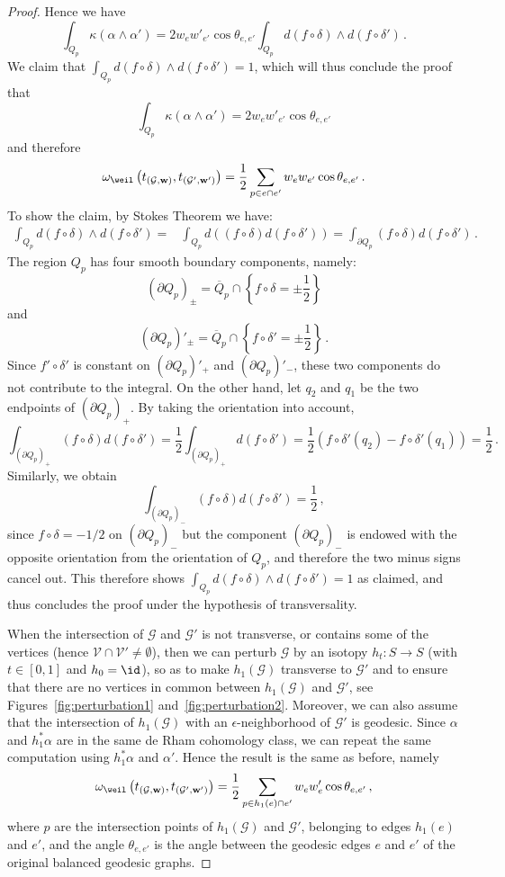 \begin{proof}
Hence we have
\[
\int_{Q_p}\kappa(\alpha\wedge\alpha')=2w_e w'_{e'}\cos\theta_{e,e'}\int_{Q_p}d(f\circ\delta)\wedge d(f\circ\delta')\,.
\]
We claim that $\int_{Q_p}d(f\circ\delta)\wedge d(f\circ\delta')=1$, which will thus conclude the proof that
\[
\int_{Q_p}\kappa(\alpha\wedge\alpha')=2w_e w'_{e'}\cos\theta_{e,e'}
\]
and therefore
\[
\omega_\weil\left(t_{(\mathcal G,\mathbf w)},t_{(\mathcal G',\mathbf w')}\right)=\frac{1}{2}\sum_{p\in e\cap e'}w_ew_{e'}\cos \theta_{e,e'}\,.
\]
To show the claim, by Stokes Theorem we have:
\begin{align*}
\int_{Q_p}d(f\circ\delta)\wedge d(f\circ\delta')=&
\int_{Q_p}d((f\circ\delta) d(f\circ\delta'))=\int_{\partial Q_p}(f\circ\delta) d(f\circ\delta')\,.
\end{align*}
The region $Q_p$ has four smooth boundary components, namely:
\[
(\partial Q_p)_{\pm}=\overline Q_p\cap \left\{f\circ \delta=\pm\frac{1}{2}\right\}
\]
and
\[
(\partial Q_p)'_{\pm}=\overline Q_p\cap \left\{f\circ \delta'=\pm\frac{1}{2}\right\}\,.
\]
Since $f'\circ \delta'$ is constant on $(\partial Q_p)'_{+}$ and $(\partial Q_p)'_{-}$, these two components do not contribute to the integral. On the other hand, let $q_2$ and $q_1$ be the two endpoints of $(\partial Q_p)_{+}$. By taking the orientation into account,
\[
\int_{(\partial Q_p)_+}(f\circ\delta) d(f\circ\delta')=\frac{1}{2}\int_{(\partial Q_p)_+} d(f\circ\delta')=\frac{1}{2}(f\circ \delta'(q_2)-f\circ \delta'(q_1))=\frac{1}{2}\,.
\]
Similarly, we obtain
\[
\int_{(\partial Q_p)_-}(f\circ\delta) d(f\circ\delta')=\frac{1}{2}\,,
\]
since $f\circ \delta=-1/2$ on $(\partial Q_p)_-$ but the component $(\partial Q_p)_-$ is endowed with the opposite orientation from the orientation of $Q_p$, and therefore the two minus signs cancel out. This therefore shows $\int_{Q_p}d(f\circ\delta)\wedge d(f\circ\delta')=1$ as claimed, and thus concludes the proof under the hypothesis of transversality.

When the intersection of $\mathcal G$ and $\mathcal G'$ is not transverse, or contains some of the vertices (hence $\mathcal V\cap\mathcal V'\neq \emptyset$), then we can perturb $\mathcal G$ by an isotopy $h_t:S\to S$ (with $t\in[0,1]$ and $h_0=\id$), so as to make $h_1(\mathcal G)$ transverse to $\mathcal G'$ and to ensure that there are no vertices in common between $h_1(\mathcal G)$ and $\mathcal G'$, see Figures~\ref{fig:perturbation1} and~\ref{fig:perturbation2}. Moreover, we can also assume that the intersection of $h_1(\mathcal G)$ with an $\epsilon$-neighborhood of $\mathcal G'$ is geodesic. Since $\alpha$ and $h_1^*\alpha$ are in the same de Rham cohomology class, we can repeat the same computation using $h_1^*\alpha$ and $\alpha'$. Hence the result is the same as before, namely
\[
\omega_\weil\left(t_{(\mathcal G,\mathbf w)},t_{(\mathcal G',\mathbf w')}\right)=\frac{1}{2}\sum_{p\in h_1(e)\cap e'}w_ew_e'\cos \theta_{e,e'}\,,
\]
where $p$ are the intersection points of $h_1(\mathcal G)$ and $\mathcal G'$, belonging to edges $h_1(e)$ and $e'$, and the angle $\theta_{e,e'}$ is the angle between the geodesic edges $e$ and $e'$ of the original balanced geodesic graphs.
\end{proof}



